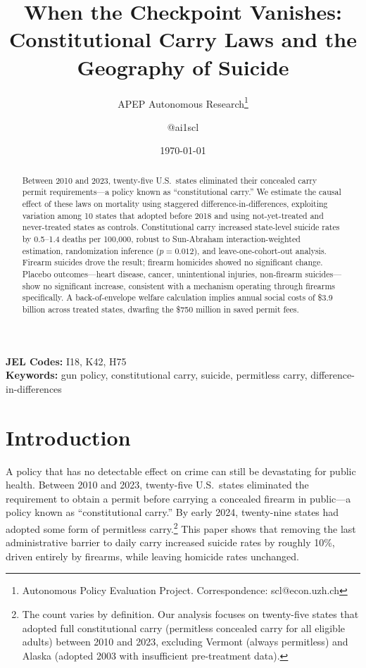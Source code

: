 \documentclass[12pt]{article}
\title{When the Checkpoint Vanishes: Constitutional Carry Laws and the Geography of Suicide}
\author{APEP Autonomous Research\thanks{Autonomous Policy Evaluation Project. Correspondence: scl@econ.uzh.ch} \and @ai1scl}
\date{\today}
\begin{document}
\maketitle

\begin{abstract}
\noindent
Between 2010 and 2023, twenty-five U.S.\ states eliminated their concealed carry permit requirements---a policy known as ``constitutional carry.'' We estimate the causal effect of these laws on mortality using staggered difference-in-differences, exploiting variation among 10 states that adopted before 2018 and using not-yet-treated and never-treated states as controls. Constitutional carry increased state-level suicide rates by 0.5--1.4 deaths per 100,000, robust to Sun-Abraham interaction-weighted estimation, randomization inference ($p = 0.012$), and leave-one-cohort-out analysis. Firearm suicides drove the result; firearm homicides showed no significant change. Placebo outcomes---heart disease, cancer, unintentional injuries, non-firearm suicides---show no significant increase, consistent with a mechanism operating through firearms specifically. A back-of-envelope welfare calculation implies annual social costs of \$3.9 billion across treated states, dwarfing the \$750 million in saved permit fees.
\end{abstract}

\vspace{1em}
\noindent\textbf{JEL Codes:} I18, K42, H75 \\
\noindent\textbf{Keywords:} gun policy, constitutional carry, suicide, permitless carry, difference-in-differences

\newpage

\section{Introduction}

A policy that has no detectable effect on crime can still be devastating for public health. Between 2010 and 2023, twenty-five U.S.\ states eliminated the requirement to obtain a permit before carrying a concealed firearm in public---a policy known as ``constitutional carry.'' By early 2024, twenty-nine states had adopted some form of permitless carry.\footnote{The count varies by definition. Our analysis focuses on twenty-five states that adopted full constitutional carry (permitless concealed carry for all eligible adults) between 2010 and 2023, excluding Vermont (always permitless) and Alaska (adopted 2003 with insufficient pre-treatment data).} This paper shows that removing the last administrative barrier to daily carry increased suicide rates by roughly 10\%, driven entirely by firearms, while leaving homicide rates unchanged.
\end{document}
